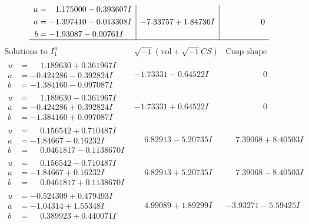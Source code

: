 \documentclass[1p]{elsarticle_modified}
\theoremstyle{definition}
\newcommand{\I}{\sqrt{-1}}
\begin{document}
$$\begin{array}{c|c|c}
\begin{aligned}
u &= \phantom{-}1.175000 - 0.393607 I \\
a &= -1.397410 - 0.013308 I \\
b &= -1.93087 - 0.00761 I\end{aligned}
 & -7.33757 + 1.84736 I & \phantom{-0.000000 } 0\\
 \hline 
 \end{array}$$\newpage$$\begin{array}{c|c|c}  
\text{Solutions to }I^u_{1}& \I (\text{vol} + \sqrt{-1}CS) & \text{Cusp shape}\\
 \hline 
\begin{aligned}
u &= \phantom{-}1.189630 + 0.361967 I \\
a &= -0.424286 - 0.392824 I \\
b &= -1.384160 - 0.097087 I\end{aligned}
 & -1.73331 - 0.64522 I & \phantom{-0.000000 } 0 \\ \hline\begin{aligned}
u &= \phantom{-}1.189630 - 0.361967 I \\
a &= -0.424286 + 0.392824 I \\
b &= -1.384160 + 0.097087 I\end{aligned}
 & -1.73331 + 0.64522 I & \phantom{-0.000000 } 0 \\ \hline\begin{aligned}
u &= \phantom{-}0.156542 + 0.710487 I \\
a &= -1.84667 - 0.16232 I \\
b &= \phantom{-}0.0461817 - 0.1138670 I\end{aligned}
 & \phantom{-}6.82913 - 5.20735 I & \phantom{-}7.39068 + 8.40503 I \\ \hline\begin{aligned}
u &= \phantom{-}0.156542 - 0.710487 I \\
a &= -1.84667 + 0.16232 I \\
b &= \phantom{-}0.0461817 + 0.1138670 I\end{aligned}
 & \phantom{-}6.82913 + 5.20735 I & \phantom{-}7.39068 - 8.40503 I \\ \hline\begin{aligned}
u &= -0.524309 + 0.479493 I \\
a &= -1.04314 + 1.55348 I \\
b &= \phantom{-}0.389923 + 0.440071 I\end{aligned}
 & \phantom{-}4.99089 + 1.89299 I & -3.93271 - 5.59425 I \\ \hline\begin{aligned}

\end{aligned}
\end{array}$$
\end{document}
